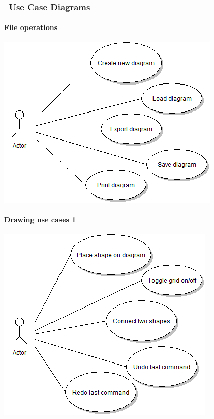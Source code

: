 \documentclass[twoside,letterpaper]{article}
\begin{document}
{\subsubsection[\ Use Case
Diagrams]{\foreignlanguage{english}{\ }\foreignlanguage{english}{Use
Case Diagrams}}
\paragraph*{File operations}
\includegraphics[scale=0.6]{../UMLdiagrams/use_case_files.png}

\paragraph*{Drawing use cases 1}
\includegraphics[scale=0.6]{../UMLdiagrams/draw1.png}
}
\end{document}
